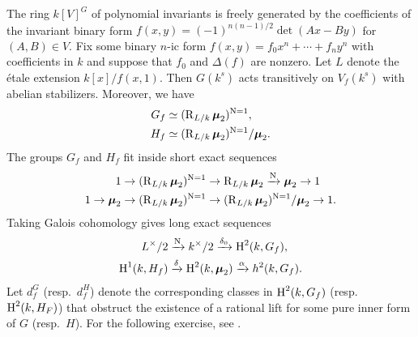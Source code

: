 The ring $k[V]^G$ of polynomial invariants is freely generated by the 
coefficients of the invariant binary form $f(x,y)=(-1)^{n(n-1)/2}\det(A x-B y)$ 
for $(A,B)\in V$. Fix some binary $n$-ic form 
$f(x,y) = f_0 x^n + \cdots + f_n y^n$ with coefficients in $k$ and suppose that 
$f_0$ and $\Delta(f)$ are nonzero. Let $L$ denote the \'etale extension 
$k[x]/f(x,1)$. Then $G(k^s)$ acts transitively on $V_f(k^s)$ with abelian 
stabilizers. Moreover, we have 
\begin{align*}
  G_f &\simeq (\operatorname{R}_{L/k}\boldsymbol\mu_2)^{\operatorname{N}=1} , \\
  H_f &\simeq (\operatorname{R}_{L/k}\boldsymbol\mu_2)^{\operatorname{N}=1}/\boldsymbol\mu_2 .
\end{align*}
The groups $G_f$ and $H_f$ fit inside short exact sequences 
\begin{align*}
  1 \to (\operatorname{R}_{L/k}\boldsymbol\mu_2)^{\operatorname{N}=1} &\to \operatorname{R}_{L/k}\boldsymbol\mu_2 \xrightarrow{\operatorname{N}} \boldsymbol\mu_2 \to 1 \\
  1 \to \boldsymbol\mu_2 \to (\operatorname{R}_{L/k}\boldsymbol\mu_2)^{\operatorname{N}=1} &\to (\operatorname{R}_{L/k}\boldsymbol\mu_2)^{\operatorname{N}=1}/\boldsymbol\mu_2 \to 1 .
\end{align*}
Taking Galois cohomology gives long exact sequences 
\begin{align*}
  L^\times / 2 &\xrightarrow{\operatorname{N}} k^\times / 2 \xrightarrow{\delta_0} \operatorname{H}^2(k,G_f) , \\
  \operatorname{H}^1(k,H_f) &\xrightarrow{\delta} \operatorname{H}^2(k,\boldsymbol\mu_2) \xrightarrow\alpha h^2(k,G_f) .
\end{align*}
Let $d_f^G$ (resp.~$d_f^H$) denote the corresponding classes in $\operatorname{H}^2(k,G_f)$ 
(resp.~$\operatorname{H}^2(k,H_F)$) that obstruct the existence of a rational lift for some 
pure inner form of $G$ (resp.~$H$). For the following exercise, see 
\cite[\S 4.5]{bgw13}. 

